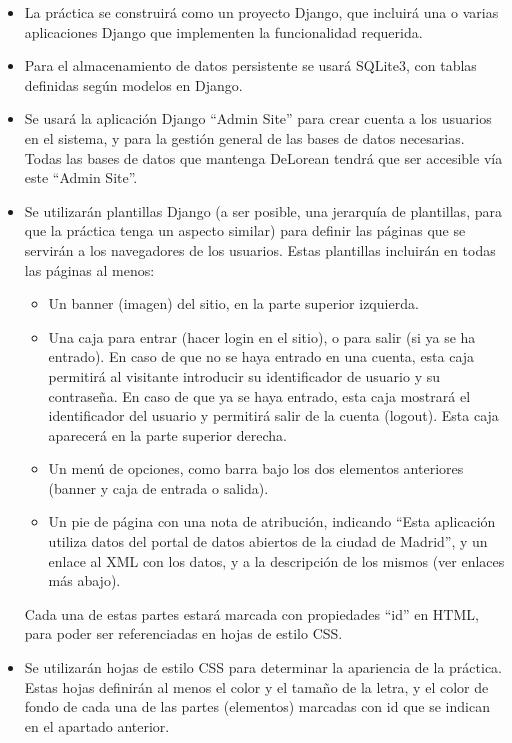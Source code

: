 \begin{itemize}

\item La práctica se construirá como un proyecto Django, que incluirá una o varias aplicaciones Django que implementen la funcionalidad requerida.

\item Para el almacenamiento de datos persistente se usará SQLite3, con tablas definidas según modelos en Django.

\item Se usará la aplicación Django ``Admin Site'' para crear cuenta a los usuarios en el sistema, y para la gestión general de las bases de datos necesarias. Todas las bases de datos que mantenga DeLorean tendrá que ser accesible vía este ``Admin Site''.

\item Se utilizarán plantillas Django (a ser posible, una jerarquía de plantillas, para que la práctica tenga un aspecto similar) para definir las páginas que se servirán a los navegadores de los usuarios. Estas plantillas incluirán en todas las páginas al menos:
  \begin{itemize}
  \item Un banner (imagen) del sitio, en la parte superior izquierda.
  \item Una caja para entrar (hacer login en el sitio), o para salir (si ya se ha entrado). En caso de que no se haya entrado en una cuenta, esta caja permitirá al visitante introducir su identificador de usuario y su contraseña. En caso de que ya se haya entrado, esta caja mostrará el identificador del usuario y permitirá salir de la cuenta (logout). Esta caja aparecerá en la parte superior derecha.
  \item Un menú de opciones, como barra bajo los dos elementos anteriores (banner y caja de entrada o salida).
  \item Un pie de página con una nota de atribución, indicando ``Esta aplicación utiliza datos del portal de datos abiertos de la ciudad de Madrid'', y un enlace al XML con los datos, y a la descripción de los mismos (ver enlaces más abajo).
  \end{itemize}

Cada una de estas partes estará marcada con propiedades ``id'' en HTML, para poder ser referenciadas en hojas de estilo CSS.

\item Se utilizarán hojas de estilo CSS para determinar la apariencia de la práctica. Estas hojas definirán al menos el color y el tamaño de la letra, y el color de fondo de cada una de las partes (elementos) marcadas con id que se indican en el apartado anterior.


\end{itemize}
